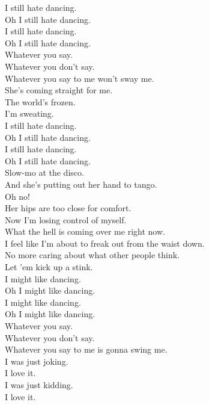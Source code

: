 

I still hate dancing. \\
Oh I still hate dancing. \\
I still hate dancing. \\
Oh I still hate dancing. \\

Whatever you say. \\
Whatever you don't say. \\
Whatever you say to me won't sway me. \\

She's coming straight for me. \\
The world's frozen. \\
I'm sweating. \\

I still hate dancing. \\
Oh I still hate dancing. \\
I still hate dancing. \\
Oh I still hate dancing. \\

Slow-mo at the disco. \\
And she's putting out her hand to tango. \\
Oh no! \\
Her hips are too close for comfort. \\
Now I'm losing control of myself. \\
What the hell is coming over me right now. \\
I feel like I'm about to freak out from the waist down. \\
No more caring about what other people think. \\
Let 'em kick up a stink. \\

I might like dancing. \\
Oh I might like dancing. \\
I might like dancing. \\
Oh I might like dancing. \\

Whatever you say. \\
Whatever you don't say. \\
Whatever you say to me is gonna swing me. \\

I was just joking. \\
I love it. \\
I was just kidding. \\
I love it. \\

